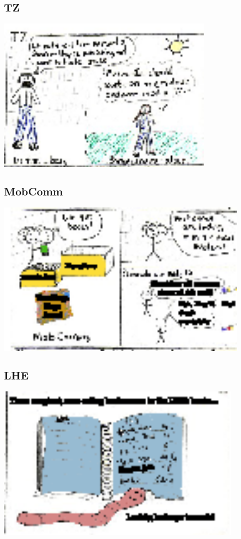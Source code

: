 \documentclass[10pt]{article}
\begin{document}
\subsection*{TZ}
\includegraphics[height = 3in]{panel.2004-03-12.02.eps}

\subsection*{MobComm}
\includegraphics[height = 3in]{panel.2004-03-12.03.eps}

\subsection*{LHE}
\includegraphics[height = 3in]{panel.2004-03-12.04.eps}
\end{document}
